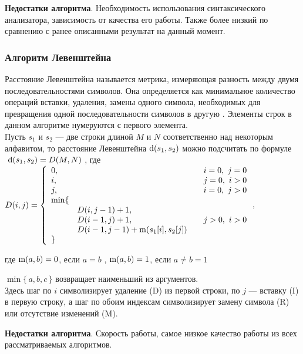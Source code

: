 \documentclass[12pt]{article}
\begin{document}
\textbf{Недостатки алгоритма}. Необходимость использования синтаксического анализатора, зависимость от качества его работы. Также более низкий по сравнению с ранее описанными результат на данный момент.

\subsubsection{Алгоритм Левенштейна}

Расстояние Левенштейна называется метрика, измеряющая разность между двумя последовательностями символов. Она определяется как минимальное количество операций вставки, удаления, замены одного символа, необходимых для превращения одной последовательности символов в другую .  Элементы строк в данном алгоритме нумеруются с первого элемента.\\

Пусть ${\displaystyle s_{1}}$ и ${\displaystyle s_{2}}$ — две строки длиной ${\displaystyle M}$ и ${\displaystyle N}$ соответственно над некоторым алфавитом, то расстояние Левенштейна ${\displaystyle {\rm {d}}(s_{1},s_{2})}$ можно подсчитать по формуле \\

 ${\displaystyle \ {\rm {d}}(s_{1},s_{2})=D(M,N)}$ , где \\

 ${\displaystyle D(i,j)=\left\{{\begin{array}{llcl}0,&&&i=0,\ j=0\\i,&&&j=0,\ i>0\\j,&&&i=0,\ j>0\\\min\{\\&D(i,j-1)+1,\\&D(i-1,j)+1,&&j>0,\ i>0\\&D(i-1,j-1)+{\rm {m}}(s_{1}[i],s_{2}[j])\\\}\end{array}}\right.}$,

где  ${\displaystyle {\rm {m}}(a,b)}=0$, если ${\displaystyle a=b}$ , ${\displaystyle {\rm {m}}(a,b)}=1$, если ${\displaystyle a \neq b}=1$ 

${\displaystyle \min\{\,a,b,c\,\}}$ возвращает наименьший из аргументов. \\

Здесь шаг по ${\displaystyle i}$ символизирует удаление (D) из первой строки, по ${\displaystyle j}$ — вставку (I) в первую строку, а шаг по обоим индексам символизирует замену символа (R) или отсутствие изменений (M). 
	
\textbf{Недостатки алгоритма}. Скорость работы, самое низкое качество работы из всех рассматриваемых алгоритмов.
\newpage
\end{document}
